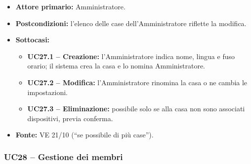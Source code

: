 \documentclass[12pt,a4paper]{article}
\newcommand{\tightlist}{\setlength{\itemsep}{1pt}\setlength{\parskip}{0pt}}
\begin{document}
\begin{itemize}

\tightlist

\item \textbf{Attore primario:} Amministratore.

\item \textbf{Postcondizioni:} l'elenco delle case dell'Amministratore riflette la modifica.

\item \textbf{Sottocasi:}

\begin{itemize}

\tightlist

\item \textbf{UC27.1 -- Creazione:} l'Amministratore indica nome, lingua e fuso orario; il sistema crea la casa e lo nomina Amministratore.

\item \textbf{UC27.2 -- Modifica:} l'Amministratore rinomina la casa o ne cambia le impostazioni.

\item \textbf{UC27.3 -- Eliminazione:} possibile solo se alla casa non sono associati dispositivi, previa conferma.

\end{itemize}

\item \textbf{Fonte:} VE 21/10 (``se possibile di più case'').

\end{itemize}



\subsubsection{UC28 -- Gestione dei membri}
\end{document}
